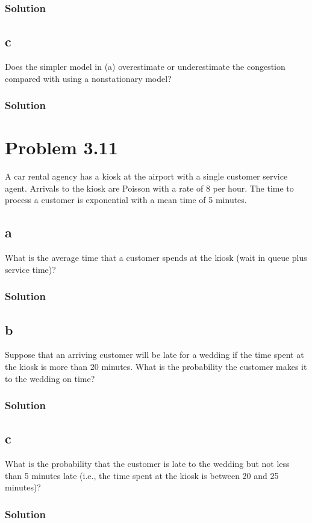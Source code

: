 \documentclass[letterpaper]{amsart}
\begin{document}
\subsubsection*{Solution}
\subsection*{c}
Does the simpler model in (a) overestimate or underestimate the congestion compared with using a nonstationary model?
\subsubsection*{Solution}

\section{Problem 3.11} %
A car rental agency has a kiosk at the airport with a single customer service
agent. Arrivals to the kiosk are Poisson with a rate of 8 per hour. The time
to process a customer is exponential with a mean time of 5 minutes.
\subsection*{a}
What is the average time that a customer spends at the kiosk (wait in
queue plus service time)?
\subsubsection*{Solution}
\subsection*{b}
Suppose that an arriving customer will be late for a wedding if the time
spent at the kiosk is more than 20 minutes. What is the probability the
customer makes it to the wedding on time?
\subsubsection*{Solution}
\subsection*{c}
What is the probability that the customer is late to the wedding but not
less than 5 minutes late (i.e., the time spent at the kiosk is between 20
and 25 minutes)?
\subsubsection*{Solution}
\end{document}
